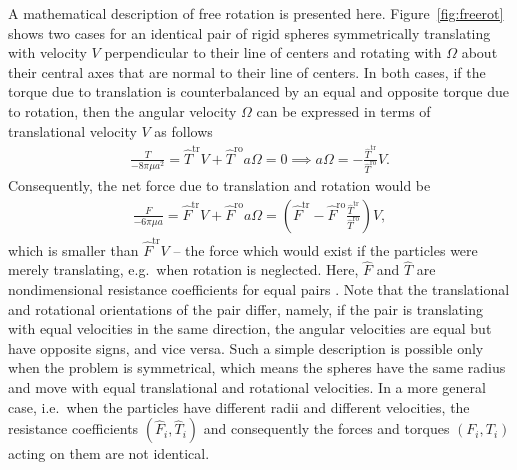 \documentclass[../thesis.tex]{subfiles}
\begin{document}
A mathematical description of free rotation is presented here. Figure~\ref{fig:freerot} shows two cases for an identical pair of rigid spheres symmetrically translating with velocity $V$ perpendicular to their line of centers and rotating with $\Omega$ about their central axes that are normal to their line of centers. In both cases, if the torque due to translation is counterbalanced by an equal and opposite torque due to rotation, then the angular velocity $\Omega$ can be expressed in terms of translational velocity $V$ as follows
\begin{align}
\frac{T}{-8\pi\mu a^2} = \hat{T}^\text{tr}V + \hat{T}^\text{ro}a\Omega = 0 \implies a\Omega = -\frac{\hat{T}^\text{tr}}{\hat{T}^\text{ro}} V. \label{eq:free}
\end{align}
Consequently, the net force due to translation and rotation would be
\begin{align}
\frac{F}{-6\pi\mu a} = \hat{F}^\text{tr}V + \hat{F}^\text{ro}a\Omega = \left(\hat{F}^\text{tr}-\hat{F}^\text{ro}\frac{\hat{T}^\text{tr}}{\hat{T}^\text{ro}}\right) V, \label{eq:freerot}
\end{align}
which is smaller than $\hat{F}^\text{tr}V$ -- the force which would exist if the particles were merely translating, e.g.\ when rotation is neglected. Here, $\hat{F}$ and $\hat{T}$ are nondimensional resistance coefficients for equal pairs \citep{GCB66,ON69}. Note that the translational and rotational orientations of the pair differ, namely, if the pair is translating with equal velocities in the same direction, the angular velocities are equal but have opposite signs, and vice versa. Such a simple description is possible only when the problem is symmetrical, which means the spheres have the same radius and move with equal translational and rotational velocities. In a more general case, i.e.\ when the particles have different radii and different velocities, the resistance coefficients $(\hat{F}_i,\hat{T}_i)$ and consequently the forces and torques $(F_i,T_i)$ acting on them are not identical.
\end{document}
